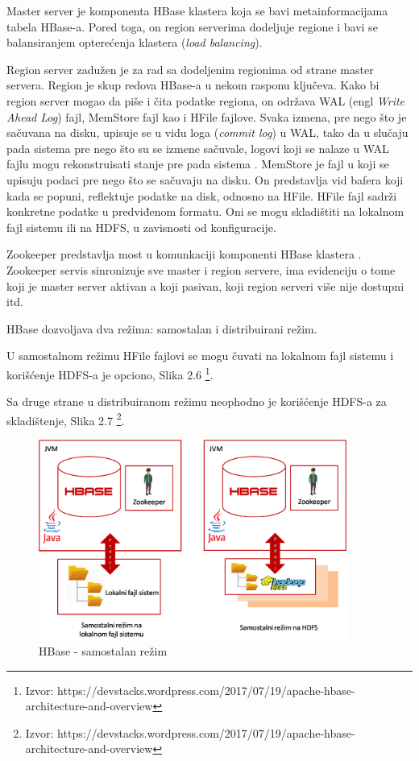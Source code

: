 \documentclass[12pt,oneside]{memoir}
\begin{document}
Master server  je komponenta HBase klastera koja se bavi metainformacijama tabela HBase-a. Pored toga, on region serverima dodeljuje regione i bavi se balansiranjem opterećenja klastera (\textit{load balancing}).

Region server zadužen je za rad sa dodeljenim regionima od strane master servera. Region je skup redova HBase-a u nekom rasponu ključeva. Kako bi region server mogao da piše i čita podatke regiona, on održava WAL (engl \textit{Write Ahead Log}) fajl, MemStore fajl kao i HFile fajlove. Svaka izmena, pre nego što je sačuvana na disku, upisuje se u vidu loga (\textit{commit log}) u WAL, tako da u slučaju pada sistema pre nego što su se izmene sačuvale, logovi koji se nalaze u WAL fajlu mogu rekonstruisati stanje pre pada sistema \cite{wal}. MemStore je fajl u koji se upisuju podaci pre nego što se sačuvaju na disku. On predstavlja vid bafera koji kada se popuni, reflektuje podatke na disk, odnosno na HFile. HFile fajl sadrži konkretne podatke u predviđenom formatu. Oni se mogu skladištiti na lokalnom fajl sistemu ili na HDFS, u zavisnosti od konfiguracije.

Zookeeper predstavlja most u komunkaciji komponenti HBase klastera \cite{zookeeper}. Zookeeper servis  sinronizuje sve master i region servere, ima evidenciju o tome koji je master server aktivan a koji pasivan, koji region serveri više nije dostupni itd.

HBase dozvoljava dva režima: samostalan i distribuirani režim.

U samostalnom režimu HFile fajlovi se mogu čuvati na lokalnom fajl sistemu i korišćenje HDFS-a je opciono, Slika 2.6  \footnote{Izvor: https://devstacks.wordpress.com/2017/07/19/apache-hbase-architecture-and-overview}.

Sa druge strane u distribuiranom režimu neophodno je korišćenje HDFS-a za skladištenje, Slika 2.7 \footnote{Izvor: https://devstacks.wordpress.com/2017/07/19/apache-hbase-architecture-and-overview}. 

\begin{figure}[!ht]
  \centering
  \includegraphics[width=0.9\textwidth]{hbase-standalone.png}
  \caption{HBase - samostalan režim }
  \label{fig:grafikon}
\end{figure}
\end{document}
